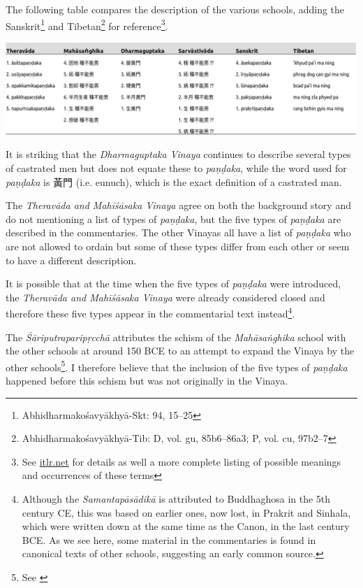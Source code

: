 The following table compares the description of the various schools, adding the Sanskrit\footnote{Abhidharmakośavyākhyā-Skt: 94, 15–25} and Tibetan\footnote{Abhidharmakośavyākhyā-Tib: D, vol. gu, 85b6–86a3; P, vol. cu, 97b2–7} for reference\footnote{See \href{http://www.itlr.net/hwid:281142}{itlr.net} for details as well a more complete listing of possible meanings and occurrences of these terms}.

\includegraphics[width=\linewidth]{pandaka.jpg}
\label{pandaka}

It is striking that the {\em Dharmaguptaka Vinaya} continues to describe several types of castrated men but does not equate these to {\em paṇḍaka}, while the word used for {\em paṇḍaka} is 黃門 (i.e. eunuch), which is the exact definition of a castrated man.

The {\em Theravāda and Mahīśāsaka Vinaya} agree on both the background story and do not mentioning a list of types of {\em paṇḍaka}, but the five types of {\em paṇḍaka} are described in the commentaries. The other Vinayas all have a list of {\em paṇḍaka} who are not allowed to ordain but some of these types differ from each other or seem to have a different description.

It is possible that at the time when the five types of {\em paṇḍaka} were introduced, the {\em Theravāda and Mahīśāsaka Vinaya} were already considered closed and therefore these five types appear in the commentarial text instead\footnote{Although the {\em Samantapāsādikā} is attributed to Buddhaghosa in the 5th century CE, this was based on earlier ones, now lost, in Prakrit and Sinhala, which were written down at the same time as the Canon, in the last century BCE. As we see here, some material in the commentaries is found in canonical texts of other schools, suggesting an early common source.}. 

The {\em Śāriputraparipṛcchā} attributes the schism of the {\em Mahāsaṅghika} school with the other schools at around 150 BCE to an attempt to expand the Vinaya by the other schools\footnote{See \cite{sujato2012}}. I therefore believe that the inclusion of the five types of {\em paṇḍaka} happened before this schism but was not originally in the Vinaya.

